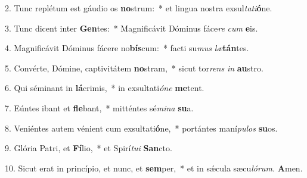 \item 2. Tunc replétum est gáudio os \textbf{no}strum:~* et lingua nostra exsul\textit{tati}\textbf{ó}ne.
\item 3. Tunc dicent inter \textbf{Gen}tes:~* Magnificávit Dóminus fáce\textit{re} \textit{cum} \textbf{e}is.
\item 4. Magnificávit Dóminus fácere no\textbf{bís}cum:~* facti su\textit{mus} \textit{læ}\textbf{tán}tes.
\item 5. Convérte, Dómine, captivitátem \textbf{no}stram,~* sicut tor\textit{rens} \textit{in} \textbf{au}stro.
\item 6. Qui séminant in \textbf{lá}crimis,~* in exsultati\textit{óne} \textbf{me}tent.
\item 7. Eúntes ibant et \textbf{fle}bant,~* mitténtes sé\textit{mina} \textbf{su}a.
\item 8. Veniéntes autem vénient cum exsultati\textbf{ó}ne,~* portántes maní\textit{pulos} \textbf{su}os.
\item 9. Glória Patri, et \textbf{Fí}lio,~* et Spirí\textit{tui} \textbf{San}cto.
\item 10. Sicut erat in princípio, et nunc, et \textbf{sem}per,~* et in sǽcula sæcu\hspace{0.03em}\textit{lórum.} \textbf{A}men.
